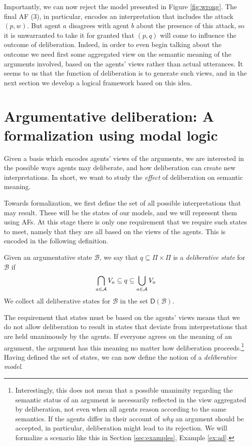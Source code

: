 \documentclass[greybox]{svmult}
\newcommand{\dstate}[1]{\mathsf D({#1}) }
\newcommand{\views}{\mathcal B}
\begin{document}
Importantly, we can now reject the model presented in Figure \ref{fig:wrong}. The final AF (3), in particular, encodes an interpretation that includes the attack $(p,w)$. But agent $a$ disagrees with agent $b$ about the presence of this attack, so it is unwarranted to take it for granted that $(p,q)$ will come to influence the outcome of deliberation. Indeed, in order to even begin talking about the outcome we need first some aggregated view on the semantic meaning of the arguments involved, based on the agents' views rather than actual utterances. It seems to us that the function of deliberation is to generate such views, and in the next section we develop a logical framework based on this idea.

\section{Argumentative deliberation: A formalization using modal logic}\label{sec:ddl}

Given a basis which encodes agents' views of the arguments, we are interested in the possible ways agents may deliberate, and how deliberation can create new interpretations. In short, we want to study the \emph{effect} of deliberation on semantic meaning.

Towards formalization, we first define the set of all possible interpretations that may result. These will be the states of our models, and we will represent them using AFs. At this stage there is only one requirement that we require such states to meet, namely that they are all based on the views of the agents. This is encoded in the following definition.
\begin{definition}\label{def:dstate}
Given an argumentative state $\views$, we say that $q \subseteq \Pi \times \Pi$ is a \emph{deliberative state} for $\views$ if
\begin{equation}\label{eq:ds}
\bigcap_{a \in \agents}V_a \subseteq q \subseteq \bigcup_{a \in \agents}V_a
\end{equation}
We collect all deliberative states for $\views$ in the set $\dstate \views$. 
\end{definition}

The requirement that states must be based on the agents' views means that we do not allow deliberation to result in states that deviate from interpretations that are held unanimously by the agents. If everyone agrees on the meaning of an argument, the argument has this meaning no matter how deliberation proceeds.\footnote{Interestingly, this does not mean that a possible unanimity regarding the semantic status of an argument is necessarily reflected in the view aggregated by deliberation, not even when all agents reason according to the same semantics. If the agents differ in their account of \emph{why} an argument should be accepted, in particular, deliberation might lead to its rejection. We will formalize a scenario like this in Section \ref{sec:examples}, Example \ref{ex:ad}.} Having defined the set of states, we can now define the notion of a \emph{deliberative model}.
\end{document}
